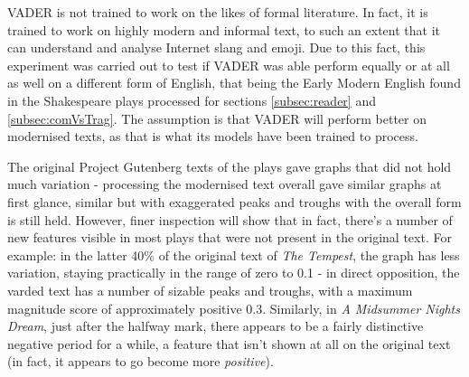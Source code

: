 \documentclass{article}
\begin{document}
        VADER is not trained to work on the likes of formal literature. In fact, it is trained to work on highly modern and informal text, to such an extent that it can understand and analyse Internet slang and emoji. Due to this fact, this experiment was carried out to test if VADER was able perform equally or at all as well on a different form of English, that being the Early Modern English found in the Shakespeare plays processed for sections \ref{subsec:reader} and \ref{subsec:comVsTrag}. The assumption is that VADER will perform better on modernised texts, as that is what its models have been trained to process.
        
        The original Project Gutenberg texts of the plays gave graphs that did not hold much variation - processing the modernised text overall gave similar graphs at first glance, similar but with exaggerated peaks and troughs with the overall form is still held. However, finer inspection will show that in fact, there's a number of new features visible in most plays that were not present in the original text. For example: in the latter 40\% of the original text of \textit{The Tempest}, the graph has less variation, staying practically in the range of zero to 0.1 - in direct opposition, the varded text has a number of sizable peaks and troughs, with a maximum magnitude score of approximately positive 0.3. Similarly, in \textit{A Midsummer Nights Dream}, just after the halfway mark, there appears to be a fairly distinctive negative period for a while, a feature that isn't shown at all on the original text (in fact, it appears to go become more \textit{positive}).
\end{document}
